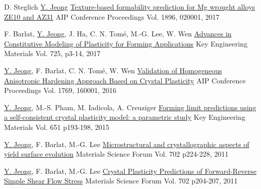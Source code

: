 \begin{cventries}
  \cventry
  {D. Steglich \underline{Y. Jeong}}
  {\href{https://doi.org/10.1063/1.5007958}{Texture-based formability prediction for Mg wrought alloys ZE10 and AZ31}}
  {AIP Conference Proceedings}
  {Vol. 1896, 020001, 2017}
  {
  }

  \cventry
  {F. Barlat, \underline{Y. Jeong}, J. Ha, C. N. Tom\'{e}, M.-G. Lee, W. Wen}
  {\href{https://dx.doi.org/10.4028/www.scientific.net/KEM.725.3}{Advances in Constitutive Modeling of Plasticity for Forming Applications}}
  {Key Engineering Materials}
  {Vol. 725, p3-14, 2017}
  {
  }

  \cventry
  {\underline{Y. Jeong}, F. Barlat, C. N. Tom\'{e}, W. Wen}
  {\href{http://dx.doi.org/10.1063/1.4963544}{Validation of Homogeneous Anisotropic Hardening Approach Based on Crystal Plasticity}}
  {AIP Conference Proceedings}
  {Vol. 1769, 160001, 2016}
  {
  }


  \cventry
  {\underline{Y. Jeong}, M.-S. Pham, M. Iadicola, A. Creuziger}
  {\href{https://doi.org/10.4028/www.scientific.net/KEM.651-653.193}{Forming limit predictions using a self-consistent crystal plasticity model: a parametric study}}
  {Key Engineering Materials}
  {Vol. 651 p193-198, 2015  }
  {
  }


  \cventry
  {\underline{Y. Jeong}, F. Barlat, M.-G. Lee}
  {\href{https://doi.org/10.4028/www.scientific.net/MSF.702-703.224}{Microstructural and crystallographic aspects of yield surface evolution}}
  {Materials Science Forum}
  {Vol. 702 p224-228, 2011}
  {
  }

  \cventry
  {\underline{Y. Jeong}, F. Barlat, M.-G. Lee}
  {\href{https://doi.org/10.4028/www.scientific.net/MSF.702-703.204}{Crystal Plasticity Predictions of Forward-Reverse Simple Shear Flow Stress}}
  {Materials Science Forum}
  {Vol. 702 p204-207, 2011}
  {
  }
\item

\end{cventries}
